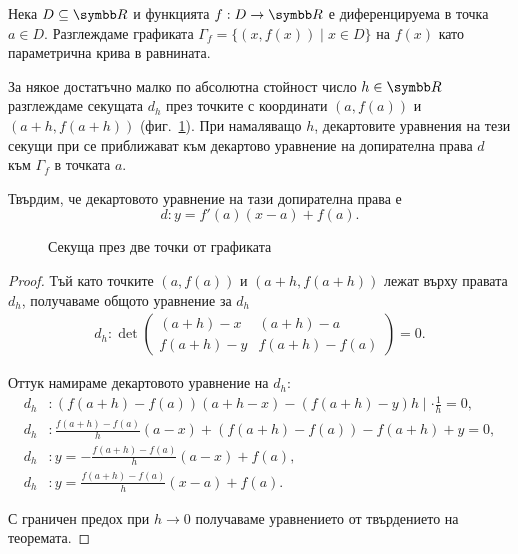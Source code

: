 \documentclass[numbers=endperiod, bibliography=totocnumbered]{scrartcl}
\begin{document}
\bigskip
\begin{minipage}{0.45\textwidth}
  \begin{theorem}
    Нека \( D \subseteq \R \) и функцията \( f: D \to \R \) е диференцируема в точка \( a \in D \). Разглеждаме графиката \( \Gamma_f = \{ (x, f(x)) \mid x \in D \} \) на \( f(x) \) като параметрична крива в равнината.

    За някое достатъчно малко по абсолютна стойност число \( h \in \R \) разглеждаме секущата \( d_h \) през точките с координати \( (a, f(a)) \) и \( (a+h, f(a+h)) \) (фиг.~\ref{fig:secant}). При намаляващо \( h \), декартовите уравнения на тези секущи при се приближават към декартово уравнение на допирателна права \( d \) към \( \Gamma_f \) в точката \( a \).

    Твърдим, че декартовото уравнение на тази допирателна права е
    \begin{equation*}
      d: y = f'(a) (x-a) + f(a).
    \end{equation*}
  \end{theorem}
\end{minipage}
\hspace{0.5cm}
\begin{minipage}{0.45\textwidth}
  \begin{figure}[H]\label{fig:secant}
    \centering
    \caption{Секуща през две точки от графиката}
  \end{figure}
\end{minipage}
\begin{proof}
  Тъй като точките \( (a, f(a)) \) и \( (a+h, f(a+h)) \) лежат върху правата \( d_h \), получаваме общото уравнение за \( d_h \)
    \begin{align*}
      d_h: \det \begin{pmatrix}
      (a+h)-x & (a+h)-a \\
      f(a+h)-y & f(a+h)-f(a)
    \end{pmatrix}
    = 0.
  \end{align*}

  Оттук намираме декартовото уравнение на \( d_h \):
  \begin{align*}
    d_h&: (f(a+h) - f(a)) (a+h-x) - (f(a+h)-y)h \mid \cdot \frac 1 h = 0,
    \\
    d_h&: \frac {f(a+h) - f(a)} h (a-x) + (f(a+h) - f(a)) - f(a+h) + y = 0,
    \\
    d_h&: y = -\frac {f(a+h) - f(a)} h (a-x) + f(a),
    \\
    d_h&: y = \frac {f(a+h) - f(a)} h (x-a) + f(a).
  \end{align*}

  С граничен предох при \( h \to 0 \) получаваме уравнението от твърдението на теоремата.
\end{proof}
\end{document}
